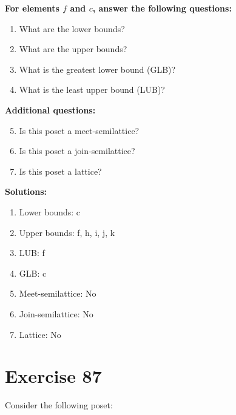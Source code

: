 \documentclass{article}
\begin{document}
    \textbf{For elements $f$ and $c$, answer the following questions:}
\begin{enumerate}
    \item What are the lower bounds?
    \item What are the upper bounds?
    \item What is the greatest lower bound (GLB)?
    \item What is the least upper bound (LUB)?
\end{enumerate}
    \hspace*{3ex} \textbf{Additional questions:}
\begin{enumerate}
    \setcounter{enumi}{4}
    \item Is this poset a meet-semilattice?
    \item Is this poset a join-semilattice?
    \item Is this poset a lattice?
\end{enumerate}

\textbf{Solutions:}
\begin{enumerate}
    \item Lower bounds: {c}
    \item Upper bounds: {f, h, i, j, k}
    \item LUB: f
    \item GLB: c
    \item Meet-semilattice: No
    \item Join-semilattice: No
    \item Lattice: No
\end{enumerate}
\newpage
\section*{Exercise 87}
Consider the following poset:
\begin{center}
\end{center}
\end{document}
